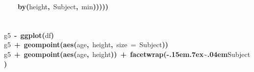 \documentclass{article}
\makeatletter
\newcommand{\hlfunctioncall}[1]{\textcolor[rgb]{.5,0,.33}{\textbf{#1}}}%
\newcommand{\hlkeyword}[1]{\textbf{#1}}%
\newcommand{\hlargument}[1]{\textcolor[rgb]{.69,.25,.02}{#1}}%
\newcommand{\hlassignement}[1]{\textbf{#1}}%
\newcommand{\hlsymbol}[1]{#1}%
\def\urltilda{\kern -.15em\lower .7ex\hbox{\~{}}\kern .04em}%
\newcommand{\hlstd}[1]{\textcolor[rgb]{0,0,0}{#1}}%
\newenvironment{kframe}{%
 \def\FrameCommand##1{\hskip\@totalleftmargin \hskip-\fboxsep
 \colorbox{shadecolor}{##1}\hskip-\fboxsep
     \hskip-\linewidth \hskip-\@totalleftmargin \hskip\columnwidth}%
 \MakeFramed {\advance\hsize-\width
   \@totalleftmargin\z@ \linewidth\hsize
   \@setminipage}}%
 {\par\unskip\endMakeFramed}
\newenvironment{knitrout}{}{} %
\makeatother
\begin{document}
\begin{knitrout}
{\begin{kframe}
\begin{flushleft}
\hlstd{}{\ }{\ }{\ }{\ }\hlfunctioncall{by}\hlkeyword{(}\hlsymbol{height}\hlkeyword{,}{\ }\hlsymbol{Subject}\hlkeyword{,}{\ }\hlsymbol{min}\hlkeyword{)}\hlkeyword{)}\hlkeyword{)}\hlkeyword{)}\hlkeyword{)}\hspace*{\fill}\\
\hlstd{}\hspace*{\fill}\\
\hlstd{}\hspace*{\fill}\\
\hlstd{}\hlsymbol{g5}{\ }\hlassignement{\usebox{\hlnormalsizeboxlessthan}-}{\ }\hlfunctioncall{ggplot}\hlkeyword{(}\hlsymbol{df}\hlkeyword{)}\hspace*{\fill}\\
\hlstd{}\hlsymbol{g5}{\ }\hlkeyword{+}{\ }\hlfunctioncall{geom\usebox{\hlnormalsizeboxunderscore}point}\hlkeyword{(}\hlfunctioncall{aes}\hlkeyword{(}\hlsymbol{age}\hlkeyword{,}{\ }\hlsymbol{height}\hlkeyword{,}{\ }\hlargument{size}{\ }\hlargument{=}{\ }\hlsymbol{Subject}\hlkeyword{)}\hlkeyword{)}\hspace*{\fill}\\
\hlstd{}\hlsymbol{g5}{\ }\hlkeyword{+}{\ }\hlfunctioncall{geom\usebox{\hlnormalsizeboxunderscore}point}\hlkeyword{(}\hlfunctioncall{aes}\hlkeyword{(}\hlsymbol{age}\hlkeyword{,}{\ }\hlsymbol{height}\hlkeyword{)}\hlkeyword{)}{\ }\hlkeyword{+}{\ }\hlfunctioncall{facet\usebox{\hlnormalsizeboxunderscore}wrap}\hlkeyword{(}\hlkeyword{\urltilda{}}\hlsymbol{Subject}\hlkeyword{)}\mbox{}
\normalfont
\end{flushleft}



\end{kframe}}
\end{knitrout}
\end{document}
